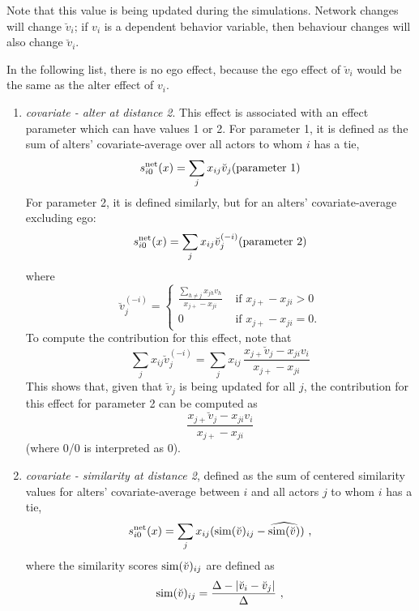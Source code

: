 \documentclass[a4paper,fleqn]{article}
\newcommand{\+}{\, + \,}
\newcommand{\vit}{\theenumi}
\newcounter{savenumi}
\begin{document}
{Note that this value is being updated during the simulations.
Network changes will change $\breve v_i$; if $v_i$ is a dependent behavior
variable, then behaviour changes will also change $\breve v_i$.

In the following list, there is no ego effect, because the ego effect
of $\breve v_i$ would be the same as the alter effect of $v_i$.

\begin{enumerate}
\setcounter{enumi}{\value{savenumi}}

\item \emph{covariate - alter at distance 2}.
      This effect is associated with an effect parameter
      which can have values 1 or 2.
      For parameter 1, it is
      defined as the sum of alters' covariate-average over all actors
      to whom $i$ has a tie,
\[
 s^{\rm net}_{i\vit}(x) = \sum_j x_{ij} \breve v_j \hfill (\text{parameter 1}) \hfill
\]
      For parameter 2, it is defined similarly,
      but for an alters' covariate-average excluding
      ego:
\[
 s^{\rm net}_{i\vit}(x) = \sum_j x_{ij} \breve v_j^{(-i)} \hfill (\text{parameter 2}) \hfill
\]
      where
\begin{equation}
  \breve v_j^{(-i)} = \left\{\begin{array}{ll} \displaystyle
         \frac{\sum_{h \neq j} x_{jh}v_h}{x_{j+} - x_{ji}}  &  \text{ if } x_{j+} - x_{ji} > 0     \\
         0                                &  \text{ if } x_{j+}- x_{ji} = 0  .
  \end{array}   \right.            \label{alt_av2}
\end{equation}
      To compute the contribution for this effect, note that
\[
 \sum_j x_{ij} \breve v_j^{(-i)} = \sum_j x_{ij} \, \frac{x_{j+} \breve v_j - x_{ji}v_i}{x_{j+}-x_{ji}}
\]
      This shows that, given that $\breve v_j$ is being updated for all $j$, the contribution
      for this effect for parameter 2 can be computed as
      \[
       \frac{x_{j+} \breve v_j - x_{ji}v_i}{x_{j+}-x_{ji}}
      \]
      (where 0/0 is interpreted as 0).
\item \emph{covariate - similarity at distance 2},
      defined as the sum of centered similarity
      values for alters' covariate-average between $i$ and all actors
      $j$ to whom $i$ has a tie,
\[
 s^{\rm net}_{i\vit}(x) = \sum_j x_{ij} ({\rm sim}(\breve v)_{ij}
  - \widehat{{\rm sim}(\breve v)}) \ ,
\]
 where the similarity scores ${\rm sim}(\breve v)_{ij}$ are defined as
\[
{\rm sim}(\breve v)_{ij}=
 \frac{\Delta-\vert \breve v_i - \breve v_j \vert}{\Delta} \ ,
\]
\end{enumerate}}
\end{document}
